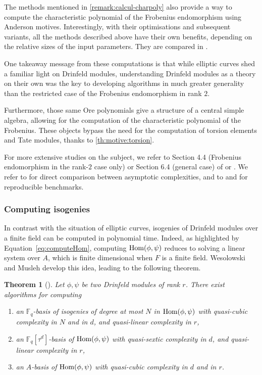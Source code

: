 \documentclass[11pt]{article}
\newtheorem{theorem}{Theorem}[section]
\theoremstyle{definition}
\newcommand{\Hom}{\text{\rm Hom}}
\begin{document}
The methods mentioned in \cref{remark:calcul-charpoly} also provide a way to
compute the characteristic polynomial of the Frobenius endomorphism using Anderson motives.
Interestingly, with their optimisations and subsequent variants, all the methods described above have their own benefits, depending on the relative sizes of the input
parameters. They are compared in \cite[Figure~1]{CL23}.

One takeaway message from these computations is that while elliptic curves
shed a familiar light on Drinfeld modules, understanding Drinfeld modules as a theory on
their own was the key to developing algorithms in much greater generality than the
restricted case of the Frobenius endomorphism in rank $2$. 

Furthermore, those same Ore polynomials give a structure of a central simple algebra, allowing for the computation of the characteristic polynomial of the
Frobenius. These objects bypass the need for the computation of torsion elements
and Tate modules, thanks to \cref{th:motive:torsion}.

For more extensive studies on the subject, we refer to Section 4.4 (Frobenius
endomorphism in the rank-$2$ case only) or Section 6.4 (general case) of
\cite{musleh_algorithms_2023} or \cite[\S~4]{musleh_computing_2019}. We refer
to \cite[Appendix A]{CL23} for direct comparison between asymptotic
complexities, and to \cite[\S~4.4.2, 5.4.2, 6.4.1]{leudiere_computing_2024} and
\cite{ayotte_drinfeld_2023} for reproducible benchmarks.

\subsubsection{Computing isogenies}
\label{computing_isogenies}

In contrast with the situation of elliptic curves, isogenies of Drinfeld modules over a finite field can be computed in polynomial time. Indeed, as highlighted by Equation~\eqref{eq:computeHom}, computing $\Hom(\phi,\psi)$ reduces to solving a linear system over $A$, which is finite dimensional when $F$ is a finite field. Wesolowski \cite{W22} and Musleh \cite[\S~7.3]{musleh_algorithms_2023} develop this idea, leading to the following theorem.

\begin{theorem}[]
    Let $\phi, \psi$ be two Drinfeld modules of rank $r$. There exist algorithms for computing
    \begin{enumerate}
        \item an $\mathbb{F}_q$-basis of isogenies of degree at most $N$ in $\Hom(\phi,\psi)$ with quasi-cubic complexity in $N$ and in $d$, and quasi-linear complexity in $r$,
        \item an $\mathbb{F}_q[\tau^d]$-basis of $\Hom(\phi,\psi)$ with quasi-sextic complexity in $d$, and quasi-linear complexity in $r$,
        \item an $A$-basis of $\Hom(\phi,\psi)$ with quasi-cubic complexity in $d$ and in $r$.
    \end{enumerate} 
\end{theorem}
\end{document}
